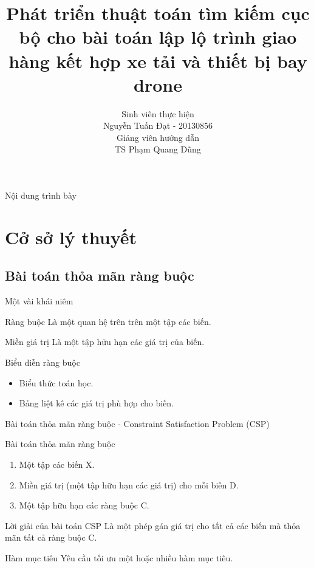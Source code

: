 \documentclass[compress]{beamer}
\title[Phát triển thuật toán tìm kiếm cục bộ cho bài toán lập lộ trình giao hàng kết hợp xe tải và thiết bị bay drone]{Phát triển thuật toán tìm kiếm cục bộ cho bài toán lập lộ trình giao hàng kết hợp xe tải và thiết bị bay drone}
\author[Nguyễn Tuấn Đạt]{
Sinh viên thực hiện\\
Nguyễn Tuấn Đạt - 20130856 \\[1em]
Giảng viên hướng dẫn\\
TS Phạm Quang Dũng}
\begin{document}
\begin{frame}[plain]
\titlepage
\end{frame}

\begin{frame}[plain]{Nội dung trình bày}
\tableofcontents
\end{frame}

\section{Cở sở lý thuyết}
\subsection{Bài toán thỏa mãn ràng buộc}
\begin{frame}{Một vài khái niêm}
\begin{block}{Ràng buộc}
Là một quan hệ trên trên một tập các biến.
\end{block}
\begin{block}{Miền giá trị}
Là một tập hữu hạn các giá trị của biến.
\end{block}
\begin{block}{Biểu diễn ràng buộc}
\begin{itemize}
\item Biểu thức toán học.
\item Bảng liệt kê các giá trị phù hợp cho biến.
\end{itemize}
\end{block}
\end{frame}
\begin{frame}{Bài toán thỏa mãn ràng buộc -  Constraint Satisfaction Problem (CSP) }
\begin{block}{Bài toán thỏa mãn ràng buộc}
\begin{enumerate}
\item Một tập các biến X.
\item Miền giá trị (một tập hữu hạn các giá trị) cho mỗi biến D.
\item Một tập hữu hạn các ràng buộc C.
\end{enumerate}
\end{block}
\begin{block}{Lời giải của bài toán CSP}
Là một phép gán giá trị cho tất cả các biến mà thỏa mãn tất cả ràng buộc C.

\end{block}
\begin{alertblock}{Hàm mục tiêu}
Yêu cầu tối ưu một hoặc nhiều hàm mục tiêu.
\end{alertblock}
\end{frame}
\end{document}
